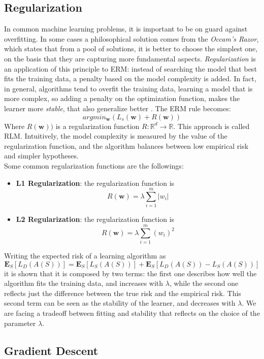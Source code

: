 \subsection{Regularization}
In common machine learning problems, it is important to be on guard against overfitting. In some cases a philosophical solution comes from the \textit{Occam's Razor}, which states that from a pool of solutions, it is better to choose the simplest one, on the basis that they are capturing more fundamental aspects. \textit{Regularization} is an application of this principle to \ac{ERM}: instead of searching the model that best fits the training data, a penalty based on the model complexity is added. In fact, in general, algorithms tend to overfit the training data, learning a model that is more complex, so adding a penalty on the optimization function, makes the learner more \textit{stable}, that also generalize better \cite{stability_generalization}.
The \ac{ERM} rule becomes:
\[argmin_\mathbf{w} (L_s(\mathbf{w}) + R(\mathbf{w}))\]
Where $R(\mathbf{w}))$ is a regularization function $R: \mathbb{R}^d \rightarrow \mathbb{R} $. This approach is called \ac{RLM}. Intuitively, the model complexity is measured by the value of the regularization function, and the algorithm balances between low empirical risk and simpler hypotheses.\\
Some common regularization functions are the followings:
\begin{itemize}
	\item \textbf{L1 Regularization}: the regularization function is
	\[ R(\textbf{w}) = \lambda \sum_{i=1}^{m} |w_i| \]
	\item \textbf{L2 Regularization}: the regularization function is
	\[ R(\textbf{w}) = \lambda \sum_{i=1}^{m} (w_i)^2 \]
\end{itemize}

Writing the expected risk of a learning algorithm as
\[ \mathbf{E}_S[L_D(A(S))] = \mathbf{E}_S[L_S(A(S))] + \mathbf{E}_S[L_D(A(S)) - L_S(A(S))] \]
it is shown that it is composed by two terms: the first one describes how well the algorithm fits the training data, and increases with $\lambda$, while the second one reflects just the difference between the true risk and the empirical risk. This second term can be seen as the stability of the learner, and decreases with $\lambda$. We are facing a tradeoff between fitting and stability that reflects on the choice of the parameter $\lambda$. 



\subsection{Gradient Descent}


